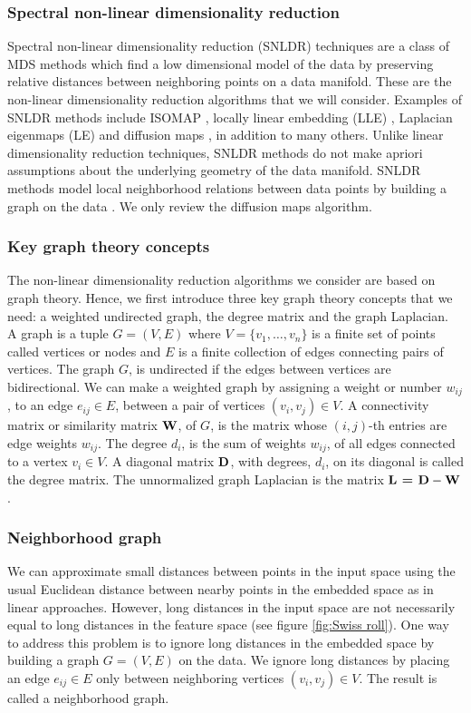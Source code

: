 \subsubsection{Spectral non-linear dimensionality reduction}
Spectral non-linear dimensionality reduction (SNLDR) techniques are a 
class of MDS methods which find a low dimensional model of the data by preserving relative distances between neighboring points on a data manifold. These are the non-linear dimensionality reduction algorithms that we will consider. Examples of SNLDR methods include ISOMAP \cite{TenenbaumJB2000Aggf}, locally linear embedding (LLE)  \cite{roweis2000nonlinear}, Laplacian eigenmaps (LE) \cite{belkin2003laplacian} and diffusion maps \cite{coifman2006diffusion}, in addition to many others. Unlike linear dimensionality reduction techniques, SNLDR methods do not make apriori assumptions about the underlying geometry of the data manifold. SNLDR methods model local neighborhood relations between data points by building a graph on the data  \cite{Luxburg2007}. We only review the diffusion maps algorithm.


\subsubsection{Key graph theory concepts}
The non-linear dimensionality reduction algorithms we consider are based on graph theory. Hence, we first introduce three key graph theory concepts that we need: a weighted undirected graph, the degree matrix and the graph Laplacian.\\

A graph is a tuple $G = (V,E)$ where $V = \{v_1, \ldots , v_n\}$ is a finite set of points called vertices or nodes and $E$ is a finite collection of edges connecting pairs of vertices. The graph $G$, is undirected if the edges between vertices are bidirectional.
We can make a weighted graph by assigning a weight or number $w_{ij}$, to an edge $e_{ij} \in E$, between a pair of vertices $(v_i, v_j) \in V$. A connectivity matrix or similarity matrix $\textbf{W}$, of $G$, is the matrix whose $(i,j)$-th entries are edge weights $w_{ij}$.
The degree $d_i$, is the sum of weights $w_{ij}$, of all edges connected to a vertex $v_i \in V$.
A diagonal matrix $\textbf{D}$, with degrees, $d_{i}$, on its diagonal is called the degree matrix.
The unnormalized graph Laplacian is the  matrix $\textbf{L = D} - \textbf{W}$.


\subsubsection{Neighborhood graph}
We can approximate small distances between points in the input space using the usual Euclidean distance between nearby points in the embedded space as in linear approaches. However, long distances in the input space are not necessarily equal to long distances in the feature space (see figure \ref{fig:Swiss roll}). One way to address this problem is to ignore long distances in the embedded space by building a graph $G = (V, E)$ on the data. We ignore long distances by placing an edge $e_{ij} \in E$ only between neighboring vertices $(v_i, v_j) \in V$. The result is called 
a neighborhood graph.\\

